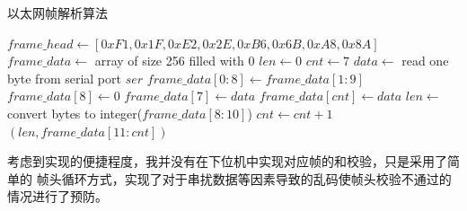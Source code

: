     \begin{algorithm}[H]
    \caption{以太网帧解析算法}
    \label{algorithm::UART}
    \begin{algorithmic}[1]
        \State $frame\_head \gets [0xF1, 0x1F, 0xE2, 0x2E, 0xB6, 0x6B, 0xA8, 0x8A]$ 
        \State $frame\_data \gets$ array of size 256 filled with 0 
        \State $len \gets 0$
        \State $cnt \gets 7$ 
            \State $data \gets$ read one byte from serial port $ser$ 
                \State $frame\_data[0:8] \gets frame\_data[1:9]$
                \State $frame\_data[8] \gets 0$ 
                \State $frame\_data[7] \gets data$
            \EndIf
                \State $frame\_data[cnt] \gets data$
                    \State $len \gets$ convert bytes to integer($frame\_data[8:10]$)
                \EndIf
                \State $cnt \gets cnt + 1$
            \EndIf
             
                \State \Return $(len, frame\_data[11:cnt])$ 
            \EndIf
        \EndWhile
    \EndFunction
    \end{algorithmic}
    \end{algorithm}
    
    考虑到实现的便捷程度，我并没有在下位机中实现对应帧的和校验，只是采用了简单的
    帧头循环方式，实现了对于串扰数据等因素导致的乱码使帧头校验不通过的情况进行了预防。
